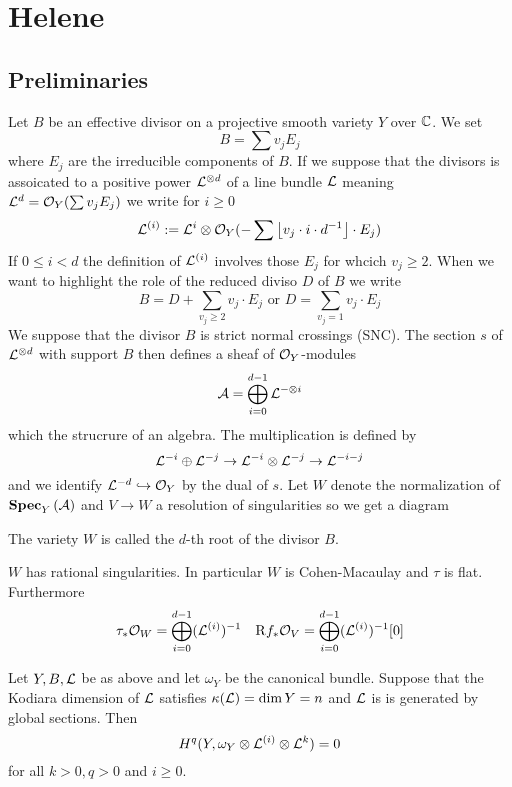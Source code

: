 \documentclass[12pt]{article}
\newcommand{\R}{\mathrm{R}}
\begin{document}
\section{Helene}

\subsection{Preliminaries}

Let $B$ be an effective divisor on a projective smooth variety $Y$ over $\mathbb{C}$. We set
\[ B = \sum v_j E_j \]
where $E_j$ are the irreducible components of $B$. If we suppose that the divisors is assoicated to a positive power $\mathcal{L}^{\otimes d}$ of a line bundle $\mathcal{L}$ meaning $\mathcal{L}^d = \mathcal{O}_{Y}(\sum v_j E_j)$ we write for $i \ge 0$
\[ \mathcal{L}^{(i)} := \mathcal{L}^i \otimes \mathcal{O}_{Y}(-\sum \left\lfloor  v_j \cdot i \cdot d^{-1} \right\rfloor \cdot E_j) \]
If $0 \le i < d$ the definition of $\mathcal{L}^{(i)}$ involves those $E_j$ for whcich $v_j \ge 2$. When we want to highlight the role of the reduced diviso $D$ of $B$ we write
\[ B = D + \sum_{v_j \ge 2} v_j \cdot E_j \text{ or } D = \sum_{v_j = 1} v_j \cdot E_j \]
We suppose that the divisor $B$ is strict normal crossings (SNC). The section $s$ of $\mathcal{L}^{\otimes d}$ with support $B$ then defines a sheaf of $\mathcal{O}_{Y}$-modules
\[ \mathcal{A} = \bigoplus_{i = 0}^{d-1} \mathcal{L}^{-\otimes i} \]
which the strucrure of an algebra. The multiplication is defined by
\[ \mathcal{L}^{-i} \oplus \mathcal{L}^{-j} \to \mathcal{L}^{-i} \otimes \mathcal{L}^{-j} \to \mathcal{L}^{-i -j} \]
and we identify $\mathcal{L}^{-d} \hookrightarrow \mathcal{O}_{Y}$ by the dual of $s$. Let $W$ denote the normalization of $\mathbf{Spec}_{Y}\left( \mathcal{A} \right)$ and $V \to W$ a resolution of singularities so we get a diagram
\begin{center}
\end{center}
The variety $W$ is called the $d$-th root of the divisor $B$. 

\begin{lemma}
$W$ has rational singularities. In particular $W$ is Cohen-Macaulay and $\tau$ is flat. Furthermore
\[ \tau_* \struct{W} = \bigoplus_{i = 0}^{d-1} (\L^{(i)})^{-1} \quad \R f_* \struct{V} = \bigoplus_{i = 0}^{d-1} (\L^{(i)})^{-1} [0] \]
\end{lemma}

\begin{theorem}
Let $Y, B, \mathcal{L}$ be as above and let $\omega_Y$ be the canonical bundle. Suppose that the Kodiara dimension of $\mathcal{L}$ satisfies $\kappa(\mathcal{L}) = \dim{Y} = n$ and $\mathcal{L}$ is is generated by global sections. Then
\[ H^q(Y, \omega_Y \otimes \mathcal{L}^{(i)} \otimes \mathcal{L}^k) = 0 \]
for all $k > 0, q > 0$ and $i \ge 0$.
\end{theorem}
\end{document}
